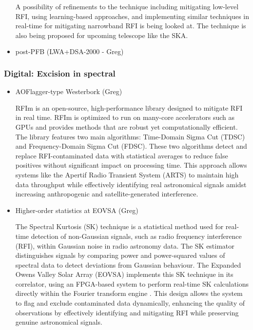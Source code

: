 \begin{itemize}
A possibility of refinements to the technique including mitigating low-level RFI, using learning-based approaches, and implementing similar techniques in real-time for mitigating narrowband RFI \cite{buch2016real} is being looked at. The technique is also being proposed \cite{buch2023real}for upcoming telescope like the SKA.\\


\item post-PFB (LWA+DSA-2000 - Greg)
\end{itemize}

\subsubsection{Digital: Excision in spectral}
\begin{itemize}
\item AOFlagger-type Westerbork (Greg)

 RFIm \cite{sclocco2019real} is an open-source, high-performance library designed to mitigate RFI in real time. RFIm is optimized to run on many-core accelerators such as GPUs and provides methods that are robust yet computationally efficient. The library features two main algorithms: Time-Domain Sigma Cut (TDSC) and Frequency-Domain Sigma Cut (FDSC). These two algorithms detect and replace RFI-contaminated data with statistical averages to reduce false positives without significant impact on processing time. This approach allows systems like the Apertif Radio Transient System (ARTS) to maintain high data throughput while effectively identifying real astronomical signals amidst increasing anthropogenic and satellite-generated interference.
 
\item Higher-order statistics at EOVSA (Greg)

The Spectral Kurtosis (SK) technique is a statistical method used for real-time detection of non-Gaussian signals, such as radio frequency interference (RFI), within Gaussian noise in radio astronomy data. The SK estimator distinguishes signals by comparing power and power-squared values of spectral data to detect deviations from Gaussian behaviour. The Expanded Owens Valley Solar Array (EOVSA) implements this SK technique in its correlator, using an FPGA-based system to perform real-time SK calculations directly within the Fourier transform engine \cite{}. This design allows the system to flag and exclude contaminated data dynamically, enhancing the quality of observations by effectively identifying and mitigating RFI while preserving genuine astronomical signals.


\end{itemize}
